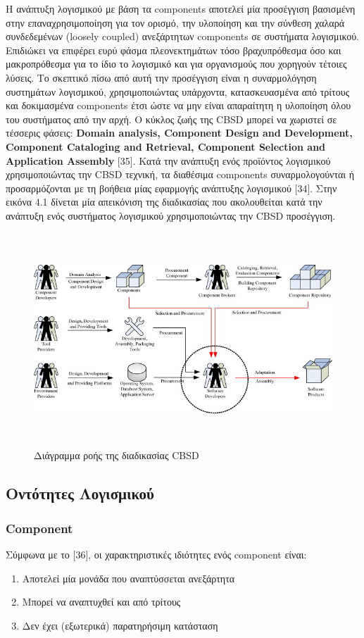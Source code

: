 Η ανάπτυξη λογισμικού με βάση τα components αποτελεί μία προσέγγιση βασισμένη στην επαναχρησιμοποίηση για τον ορισμό, την υλοποίηση και την σύνθεση χαλαρά συνδεδεμένων (loosely coupled) ανεξάρτητων components σε συστήματα λογισμικού. Επιδιώκει να επιφέρει ευρύ φάσμα πλεονεκτημάτων τόσο βραχυπρόθεσμα όσο και μακροπρόθεσμα για το ίδιο το λογισμικό και για οργανισμούς που χορηγούν τέτοιες λύσεις. Το σκεπτικό πίσω από αυτή την προσέγγιση είναι η συναρμολόγηση συστημάτων λογισμικού, χρησιμοποιώντας υπάρχοντα, κατασκευασμένα από τρίτους και δοκιμασμένα components έτσι ώστε να μην είναι απαραίτητη η υλοποίηση όλου του συστήματος από την αρχή. Ο κύκλος ζωής της CBSD μπορεί να χωριστεί σε τέσσερις φάσεις: \textbf{Domain analysis, Component Design and Development, Component Cataloging and Retrieval, Component Selection and Application Assembly} [35]. Κατά την ανάπτυξη ενός προϊόντος λογισμικού χρησιμοποιώντας την CBSD τεχνική, τα διαθέσιμα components συναρμολογούνται ή προσαρμόζονται με τη βοήθεια μίας εφαρμογής ανάπτυξης λογισμικού [34]. Στην εικόνα 4.1 δίνεται μία απεικόνιση της διαδικασίας που ακολουθείται κατά την ανάπτυξη ενός συστήματος λογισμικού χρησιμοποιώντας την CBSD προσέγγιση. 


\begin{figure}[htbp]
	\centering
		\includegraphics[height=8cm,width=15cm]{Figures/7.jpg}
	\caption{Διάγραμμα ροής της διαδικασίας CBSD \cite{Xie} }	
\end{figure}

\subsection{Οντότητες Λογισμικού}
\subsubsection{Component}
Σύμφωνα με το [36], οι χαρακτηριστικές ιδιότητες ενός component είναι:
\begin{enumerate}
	\item{Αποτελεί μία μονάδα που αναπτύσσεται ανεξάρτητα}
	\item{Μπορεί να αναπτυχθεί και από τρίτους}
	\item{Δεν έχει (εξωτερικά) παρατηρήσιμη κατάσταση}
\end{enumerate}

